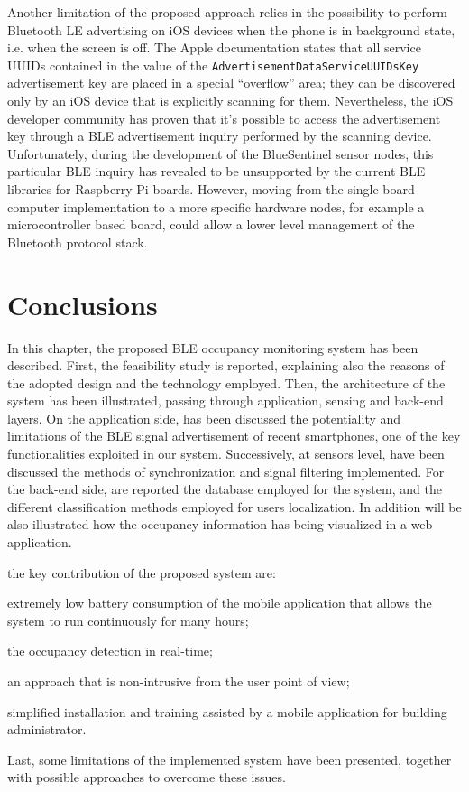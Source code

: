 \smallskip
Another limitation of the proposed approach relies in the possibility to perform Bluetooth LE advertising on iOS devices when the phone is in background state, i.e. when the screen is off.
The Apple documentation states that all service UUIDs contained in the value of the \verb|AdvertisementDataServiceUUIDsKey| advertisement key are placed in a special “overflow” area; they can be discovered only by an iOS device that is explicitly scanning for them. Nevertheless, the iOS developer community has proven that it's possible to access the advertisement key through a BLE advertisement inquiry performed by the scanning device. Unfortunately, during the development of the BlueSentinel sensor nodes, this particular BLE inquiry has revealed to be unsupported by the current BLE libraries for Raspberry Pi boards. However, moving from the single board computer implementation to a more specific hardware nodes, for example a microcontroller based board, could allow a lower level management of the Bluetooth protocol stack.

\section{Conclusions}
\label{sec:conclusion}

In this chapter, the proposed BLE occupancy monitoring system has been described. First, the feasibility study is reported, explaining also the reasons of the adopted design and the technology employed. Then, the architecture of the system has been illustrated, passing through application, sensing and back-end layers. On the application side, has been discussed the potentiality and limitations of the BLE signal advertisement of recent smartphones, one of the key functionalities exploited in our system. Successively, at sensors level, have been discussed the methods of synchronization and signal filtering implemented. For the back-end side, are reported the database employed for the system, and the different classification methods employed for users localization. In addition will be also illustrated how the occupancy information has being visualized in a web application.

the key contribution of the proposed system are:
\begin{enumerate*}[label={\textbf{(\arabic*)}}]
\item extremely low battery consumption of the mobile application that allows the system to run continuously for many hours;
\item the occupancy detection in real-time;
\item an approach that is non-intrusive from the user point of view;
\item simplified installation and training assisted by a mobile application for building administrator.
\end{enumerate*}

Last, some limitations of the implemented system have been presented, together with possible approaches to overcome these issues.

%
